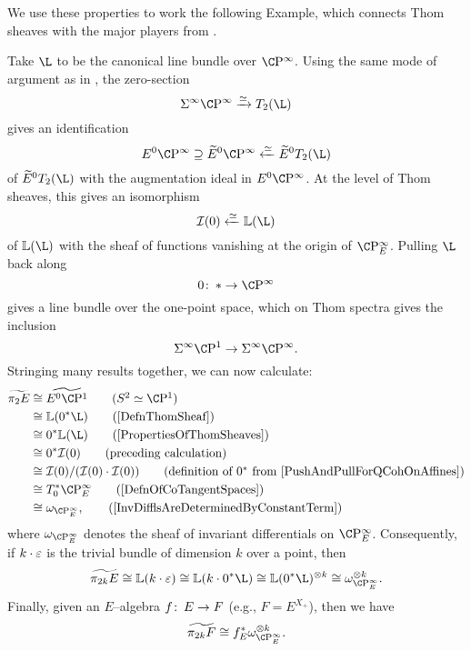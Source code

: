 We use these properties to work the following Example, which connects Thom sheaves with the major players from .

\begin{example}\label{Pi2AndInvariantDiffls}
Take \(\L\) to be the canonical line bundle over \(\CP^\infty\).  Using the same mode of argument as in , the zero-section \[\Susp^\infty \CP^\infty \xrightarrow{\simeq} T_2(\L)\] gives an identification \[E^0 \CP^\infty \supseteq \widetilde E^0 \CP^\infty \xleftarrow{\simeq} \widetilde E^0 T_2(\L)\] of \(\widetilde E^0 T_2(\L)\) with the augmentation ideal in \(E^0 \CP^\infty\).  At the level of Thom sheaves, this gives an isomorphism \[\sheaf I(0) \xleftarrow{\simeq} \ThomSheaf{\L}\] of \(\ThomSheaf{\L}\) with the sheaf of functions vanishing at the origin of \(\CP^\infty_E\).  Pulling \(\L\) back along \[0\co * \to \CP^\infty\] gives a line bundle over the one-point space, which on Thom spectra gives the inclusion \[\Susp^\infty \CP^1 \to \Susp^\infty \CP^\infty.\]  Stringing many results together, we can now calculate:
\begin{align*}
\widetilde{\pi_2 E} & \cong \widetilde{E^0 \CP^1} \tag{\(S^2 \simeq \CP^1\)} \\
& \cong \ThomSheaf{0^* \L} \tag{\Cref{DefnThomSheaf}} \\
& \cong 0^* \ThomSheaf{\L} \tag{\Cref{PropertiesOfThomSheaves}} \\
& \cong 0^* \sheaf I(0) \tag{preceding calculation} \\
& \cong \sheaf I(0) / (\sheaf I(0) \cdot \sheaf I(0)) \tag{definition of \(0^*\) from \Cref{PushAndPullForQCohOnAffines}} \\
& \cong T^*_0 \CP^\infty_E \tag{\Cref{DefnOfCoTangentSpaces}} \\
& \cong \omega_{\CP^\infty_E}, \tag{\Cref{InvDifflsAreDeterminedByConstantTerm}}
\end{align*}
where \(\omega_{\CP^\infty_E}\) denotes the sheaf of invariant differentials on \(\CP^\infty_E\).  Consequently, if \(k \cdot \varepsilon\) is the trivial bundle of dimension \(k\) over a point, then \[\widetilde{\pi_{2k} E} \cong \ThomSheaf{k \cdot \eps} \cong \ThomSheaf{k \cdot 0^* \L} \cong \ThomSheaf{0^* \L}^{\otimes k} \cong \omega_{\CP^\infty_E}^{\otimes k}.\]  Finally, given an \(E\)--algebra \(f \colon\thinspace E \to F\) (e.g., \(F = E^{X_+}\)), then we have \[\widetilde{\pi_{2k} F} \cong f_E^* \omega_{\CP^\infty_E}^{\otimes k}.\]
\end{example}

